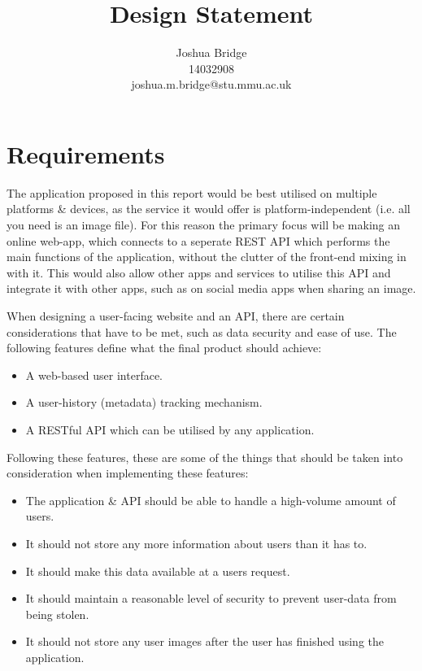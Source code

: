 \documentclass[a4paper,12pt]{article}
\title{\vspace{2cm}\textbf{Design Statement}}
\author{Joshua Bridge\\14032908\\joshua.m.bridge@stu.mmu.ac.uk}
\begin{document}
\maketitle

\tableofcontents

\listoffigures

\doublespacing

\newpage

\section{Requirements}
  The application proposed in this report would be best utilised on multiple platforms \& devices, as the service it would offer is platform-independent (i.e. all you need is an image file). For this reason the primary focus will be making an online web-app, which connects to a seperate REST \citep{fielding2000architectural} API which performs the main functions of the application, without the clutter of the front-end mixing in with it. This would also allow other apps and services to utilise this API and integrate it with other apps, such as on social media apps when sharing an image.

  When designing a user-facing website and an API, there are certain considerations that have to be met, such as data security and ease of use. The following features define what the final product should achieve:

  \begin{itemize}
    \item A web-based user interface.
    \item A user-history (metadata) tracking mechanism.
    \item A RESTful API which can be utilised by any application.
  \end{itemize}

  Following these features, these are some of the things that should be taken into consideration when implementing these features:

    \begin{itemize}
      \item The application \& API should be able to handle a high-volume amount of users.
      \item It should not store any more information about users than it has to.
      \item It should make this data available at a users request.
      \item It should maintain a reasonable level of security to prevent user-data from being stolen.
      \item It should not store any user images after the user has finished using the application.
    \end{itemize}
\end{document}
